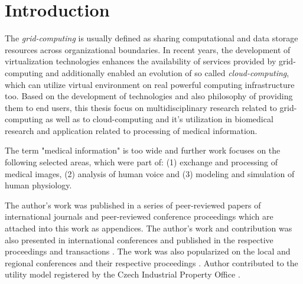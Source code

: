 \chapter{Introduction}

The \emph{grid-computing} is usually defined as sharing computational and data storage resources across organizational boundaries. In recent years, the development of virtualization technologies enhances the availability of services provided by grid-computing and additionally enabled an evolution of so called \emph{cloud-computing}, which can utilize virtual environment on real powerful computing infrastructure too. Based on the development of technologies and also philosophy of providing them to end users, this thesis focus on multidisciplinary research related to grid-computing as well as to cloud-computing and it's utilization in biomedical research and application related to processing of medical information.

The term "medical information" is too wide and further work focuses on the following selected areas, which were part of:
(1) exchange and processing of medical images, (2) analysis of human voice and (3) modeling and simulation of human physiology. %

The author's work was published in a series of peer-reviewed papers of international journals and peer-reviewed conference proceedings \cite{kulhanek2009, kulhanek2010b, kulhanek2010c,  
Kulhanek2014Parameters, Kulhanek2014Modeling, Kulhanek2014mefanet, Matejak2014sj} which are attached into this work as appendices.
The author's work and contribution was also presented in international conferences and published in the respective proceedings and transactions
\cite{Kulhanek2010, Kulhanek2013c, kofranek2013hummod, Matejak2014}. The work was also popularized on the local and regional conferences and their respective proceedings \cite{Kulhanek2008Mefanet, Sarek2009, kulhanek2009dd, Kulhanek2009Mefanet, Kulhanek2010d, Kulhanek2010Mefanet, Kulhanek2011, kulhanek2011dd, Kulhanek2012, Kulhanek2013b, Kulhanek2014, Kulhanek2012a}. Author contributed to the utility model registered by the Czech Industrial Property Office \cite{Kofranek2014a}.

